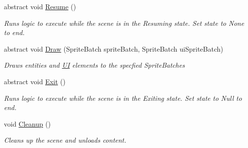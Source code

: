 \begin{DoxyCompactItemize}
abstract void \hyperlink{class_midnight_blue_1_1_engine_1_1_scenes_1_1_scene_ab7cd837b20785116007a4732d90bc548}{Resume} ()
\begin{DoxyCompactList}\small\item\em Runs logic to execute while the scene is in the Resuming state. Set state to None to end. \end{DoxyCompactList}\item 
abstract void \hyperlink{class_midnight_blue_1_1_engine_1_1_scenes_1_1_scene_a6ec0b4be6c7dc226c9afd308e1fb3fd3}{Draw} (Sprite\+Batch sprite\+Batch, Sprite\+Batch ui\+Sprite\+Batch)
\begin{DoxyCompactList}\small\item\em Draws entities and \hyperlink{namespace_midnight_blue_1_1_engine_1_1_u_i}{UI} elements to the specfied Sprite\+Batches \end{DoxyCompactList}\item 
abstract void \hyperlink{class_midnight_blue_1_1_engine_1_1_scenes_1_1_scene_adbf0f6d758df9fc5e20f24f327599e67}{Exit} ()
\begin{DoxyCompactList}\small\item\em Runs logic to execute while the scene is in the Exiting state. Set state to Null to end. \end{DoxyCompactList}\item 
void \hyperlink{class_midnight_blue_1_1_engine_1_1_scenes_1_1_scene_a7200727dfc8a3c8b0d0b9cf54f920c92}{Cleanup} ()
\begin{DoxyCompactList}\small\item\em Cleans up the scene and unloads content. \end{DoxyCompactList}\end{DoxyCompactItemize}
